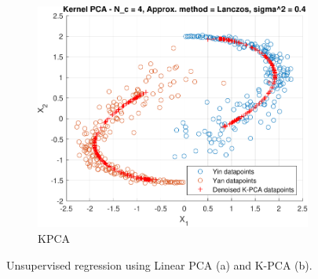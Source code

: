 \documentclass{article}
\begin{document}
\begin{figure}[h]
\begin{subfigure}[b]{0.4\textwidth}
                 \includegraphics[width=\textwidth]{Assignment 3/figures/1_1/kpca_nc_4_method_lanczos_sig2_0.4.pdf}
                 \caption{KPCA}
                 \label{fig:nonlinear_KPCA}
             \end{subfigure}
             \hspace{0.05\textwidth}
            \caption{Unsupervised regression using Linear PCA (a) and K-PCA (b).}
        \end{figure}
        
\end{document}

